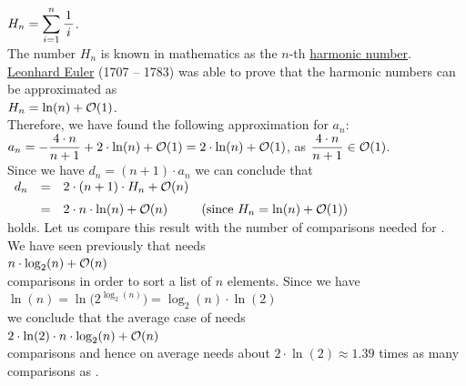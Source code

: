 \\[0.2cm]
\hspace*{1.3cm}
$H_n = \displaystyle\sum\limits_{i=1}^{n}\frac{1}{\,i\,}$.
\\[0.2cm] 
The number $H_n$ is known in mathematics as the $n$-th 
\href{http://en.wikipedia.org/wiki/Harmonic_number}{harmonic number}.
\href{http://en.wikipedia.org/wiki/Leonhard_Euler}{Leonhard Euler} (1707 -- 1783) 
was able to prove that the harmonic numbers can be approximated as
\\[0.2cm]
\hspace*{1.3cm}
$\displaystyle H_n = \ln(n) + \mathcal{O}(1)$. 
\\[0.2cm] 
Therefore, we have found the following approximation for $a_n$:
\\[0.2cm]
\hspace*{1.3cm}
$\displaystyle a_n = - \frac{4 \cdot n}{n+1}  + 2 \cdot \ln(n) + \mathcal{O}(1) =  2 \cdot \ln(n) + \mathcal{O}(1)$,
\quad as \quad $\displaystyle \frac{4 \cdot n}{n+1} \in \mathcal{O}(1)$.
\\[0.2cm]
Since we have $d_n = (n+1) \cdot a_{n}$ we can conclude that
\\[0.2cm]
\hspace*{1.3cm}
$\begin{array}{lclr}
 d_n & = &  2 \cdot(n+1) \cdot H_n + \mathcal{O}(n) \\[0.2cm]
     & = & 2 \cdot n \cdot \ln(n) + \mathcal{O}(n) & \mbox{(since $H_n = \ln(n) + \mathcal{O}(1)$)}
 \end{array}
$
\\[0.2cm]
holds.  Let us compare this result with the number of comparisons needed for .
We have seen previously that  needs
\\[0.2cm]
\hspace*{1.3cm} $n \cdot \log_2(n) + \mathcal{O}(n)$ \\[0.2cm]
comparisons in order to sort a list of $n$ elements.  Since we have
\\[0.2cm]
\hspace*{1.3cm}
$\ln(n) = \ln\bigl(2^{\log_2(n)}\bigr) =  \log_2(n) \cdot \ln(2)$
\\[0.2cm]
we conclude that the average case of  needs
 \\[0.2cm]
\hspace*{1.3cm} $2 \cdot \ln(2) \cdot n \cdot \log_2(n) + \mathcal{O}(n)$ \\[0.2cm]
comparisons and hence on average  needs about $2 \cdot \ln(2) \approx 1.39$ times as many
comparisons as .


